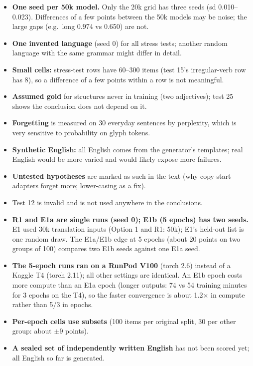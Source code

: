 \documentclass[10pt,a4paper,oneside]{article}
\begin{document}
\begin{itemize}
\item \textbf{One seed per 50k model.} Only the 20k grid has three seeds (sd 0.010--0.023). Differences of a few
points between the 50k models may be noise; the large gaps (e.g.\ long 0.974 vs 0.650) are not.
\item \textbf{One invented language} (seed 0) for all stress tests; another random language with the same grammar
might differ in detail.
\item \textbf{Small cells:} stress-test rows have 60--300 items (test 15's irregular-verb row has 8), so a difference
of a few points within a row is not meaningful.
\item \textbf{Assumed gold} for structures never in training (two adjectives); test 25 shows the conclusion does not
depend on it.
\item \textbf{Forgetting} is measured on 30 everyday sentences by perplexity, which is very sensitive to probability on
glyph tokens.
\item \textbf{Synthetic English:} all English comes from the generator's templates; real English would be more varied
and would likely expose more failures.
\item \textbf{Untested hypotheses} are marked as such in the text (why copy-start adapters forget more; lower-casing as
a fix).
\item Test 12 is invalid and is not used anywhere in the conclusions.
\item \textbf{R1 and E1a are single runs (seed 0); E1b (5 epochs) has two seeds.} E1 used 30k translation inputs
(Option 1 and R1: 50k); E1's held-out list is one random draw. The E1a/E1b edge at 5 epochs (about 20 points on two
groups of 100) compares two E1b seeds against one E1a seed.
\item \textbf{The 5-epoch runs ran on a RunPod V100} (torch 2.6) instead of a Kaggle T4 (torch 2.11); all other
settings are identical. An E1b epoch costs more compute than an E1a epoch (longer outputs: 74 vs 54 training minutes for
3 epochs on the T4), so the faster convergence is about 1.2$\times$ in compute rather than 5/3 in epochs.
\item \textbf{Per-epoch cells use subsets} (100 items per original split, 30 per other group: about $\pm$9 points).
\item \textbf{A sealed set of independently written English} has not been scored yet; all English so far is generated.
\end{itemize}
\end{document}
